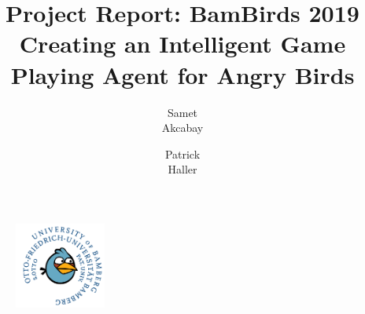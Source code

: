 \documentclass[11pt]{article}
\begin{document}
\title{Project Report: BamBirds 2019\\
	{\small Creating  an Intelligent Game Playing Agent for Angry Birds}}
\author{Samet\\Akcabay\and
	Patrick\\Haller}
\maketitle
\begin{figure}
	\centering
	\includegraphics[width=3cm,height=3cm]{img/logo.png}
\end{figure}
\newpage
\tableofcontents
\newpage







\end{document}
